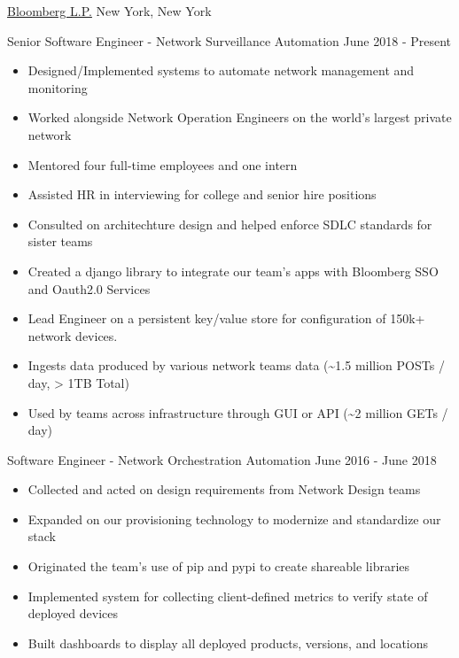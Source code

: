 \documentclass[11pt]{article}
\begin{document}
\headedsection  %
{\href{http://www.bloomberg.com/company}{Bloomberg L.P.}}
{New York, New York}
{
    \headedsubsection
    {Senior Software Engineer - Network Surveillance Automation}
    {June 2018 - Present}
    {
        \begin{itemize}
            \item Designed/Implemented systems to automate network management and monitoring
            \item Worked alongside Network Operation Engineers on the world's largest private network
            \item Mentored four full-time employees and one intern
            \item Assisted HR in interviewing for college and senior hire positions
            \item Consulted on architechture design and helped enforce SDLC standards for sister teams
            \item Created a django library to integrate our team's apps with Bloomberg SSO and Oauth2.0 Services
            \item Lead Engineer on a persistent key/value store for configuration of 150k+ network devices. 
            \item[] \nobreakhspace{1.5em}Ingests data produced by various network teams data (\textasciitilde{}1.5 million POSTs / day, > 1TB Total)
            \item[] \nobreakhspace{1.5em}Used by teams across infrastructure through GUI or API (\textasciitilde{}2 million GETs / day)
        \end{itemize}

    }
    \headedsubsection
    {Software Engineer - Network Orchestration Automation}
    {June 2016 - June 2018}
    {
        \begin{itemize}
            \item Collected and acted on design requirements from Network Design teams
            \item Expanded on our provisioning technology to modernize and standardize our stack
            \item Originated the team's use of pip and pypi to create shareable libraries
            \item Implemented system for collecting client-defined metrics to verify state of deployed devices
            \item Built dashboards to display all deployed products, versions, and locations
        \end{itemize}

}}
\end{document}
